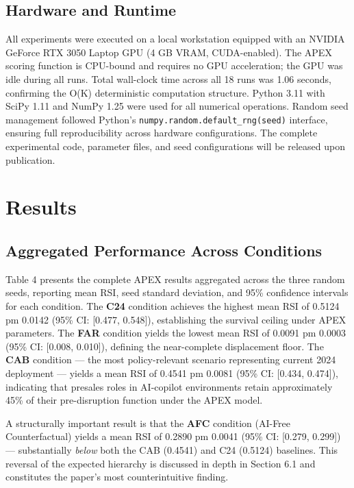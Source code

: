 \documentclass[10pt, conference]{IEEEtran}
\begin{document}
\subsection{Hardware and Runtime}

\label{sec:hardware_and_runtime}

All experiments were executed on a local workstation equipped with an NVIDIA GeForce RTX 3050 Laptop GPU (4 GB VRAM, CUDA-enabled). The APEX scoring function is CPU-bound and requires no GPU acceleration; the GPU was idle during all runs. Total wall-clock time across all 18 runs was 1.06 seconds, confirming the O(K) deterministic computation structure. Python 3.11 with SciPy 1.11 \cite{virtanen2020scipy} and NumPy 1.25 were used for all numerical operations. Random seed management followed Python's \texttt{numpy.random.default\_rng(seed)} interface, ensuring full reproducibility across hardware configurations. The complete experimental code, parameter files, and seed configurations will be released upon publication.

\section{Results}

\label{sec:results}

\subsection{Aggregated Performance Across Conditions}

\label{sec:aggregated_performance_across_conditions}

Table 4 presents the complete APEX results aggregated across the three random seeds, reporting mean RSI, seed standard deviation, and 95\% confidence intervals for each condition. The \textbf{C24} condition achieves the highest mean RSI of 0.5124 pm 0.0142 (95\% CI: [0.477, 0.548]), establishing the survival ceiling under APEX parameters. The \textbf{FAR} condition yields the lowest mean RSI of 0.0091 pm 0.0003 (95\% CI: [0.008, 0.010]), defining the near-complete displacement floor. The \textbf{CAB} condition --- the most policy-relevant scenario representing current 2024 deployment --- yields a mean RSI of 0.4541 pm 0.0081 (95\% CI: [0.434, 0.474]), indicating that presales roles in AI-copilot environments retain approximately 45\% of their pre-disruption function under the APEX model.

A structurally important result is that the \textbf{AFC} condition (AI-Free Counterfactual) yields a mean RSI of 0.2890 pm 0.0041 (95\% CI: [0.279, 0.299]) --- substantially \textit{below} both the CAB (0.4541) and C24 (0.5124) baselines. This reversal of the expected hierarchy is discussed in depth in Section 6.1 and constitutes the paper's most counterintuitive finding.
\end{document}
